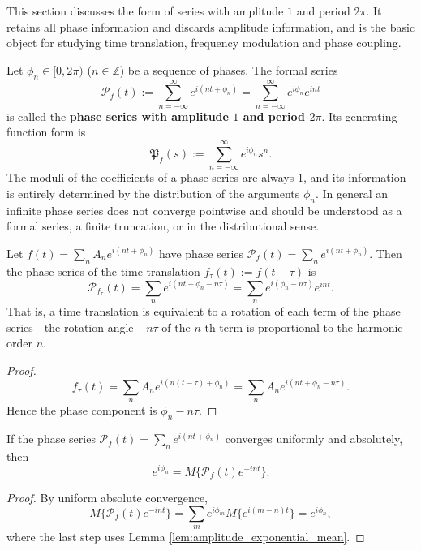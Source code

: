 This section discusses the form of series with amplitude $1$ and period $2\pi$. It retains all phase information and discards amplitude information, and is the basic object for studying time translation, frequency modulation and phase coupling.

\begin{definition}\label{def:phase_series}
Let $\phi_n \in [0,2\pi)$ ($n \in \mathbb{Z}$) be a sequence of phases. The formal series
\[
\mathcal{P}_f(t) := \sum_{n=-\infty}^{\infty} e^{i(nt+\phi_n)}
= \sum_{n=-\infty}^{\infty} e^{i\phi_n} e^{int}
\]
is called the \textbf{phase series with amplitude $1$ and period $2\pi$}. Its generating-function form is
\[
\mathfrak{P}_f(s) := \sum_{n=-\infty}^{\infty} e^{i\phi_n} s^n.
\]
The moduli of the coefficients of a phase series are always $1$, and its information is entirely determined by the distribution of the arguments $\phi_n$. In general an infinite phase series does not converge pointwise and should be understood as a formal series, a finite truncation, or in the distributional sense.
\end{definition}

\begin{proposition}\label{prop:phase_translation}
Let $f(t)=\sum_n A_n e^{i(nt+\phi_n)}$ have phase series $\mathcal{P}_f(t)=\sum_n e^{i(nt+\phi_n)}$. Then the phase series of the time translation $f_\tau(t):=f(t-\tau)$ is
\[
\mathcal{P}_{f_\tau}(t)
= \sum_n e^{i(nt+\phi_n-n\tau)}
= \sum_n e^{i(\phi_n-n\tau)}e^{int}.
\]
That is, a time translation is equivalent to a rotation of each term of the phase series---the rotation angle $-n\tau$ of the $n$-th term is proportional to the harmonic order $n$.
\end{proposition}

\begin{proof}
\[
f_\tau(t)=\sum_n A_n e^{i(n(t-\tau)+\phi_n)}
=\sum_n A_n e^{i(nt+\phi_n-n\tau)}.
\]
Hence the phase component is $\phi_n-n\tau$.
\end{proof}

\begin{lemma}\label{lem:phase_bohr_mean}
If the phase series $\mathcal{P}_f(t)=\sum_n e^{i(nt+\phi_n)}$ converges uniformly and absolutely, then
\[
e^{i\phi_n}
= M\{\mathcal{P}_f(t)e^{-int}\}.
\]
\end{lemma}

\begin{proof}
By uniform absolute convergence,
\[
M\{\mathcal{P}_f(t)e^{-int}\}
= \sum_m e^{i\phi_m} M\{e^{i(m-n)t}\}
= e^{i\phi_n},
\]
where the last step uses Lemma \ref{lem:amplitude_exponential_mean}.
\end{proof}

